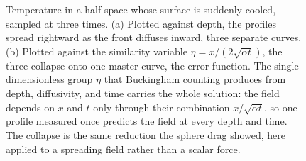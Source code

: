 \begin{figure}[htbp]
\caption[Similarity collapse of a transient-diffusion profile]{Temperature
in a half-space whose surface is suddenly cooled, sampled at three times.
(a) Plotted against depth, the profiles spread rightward as the front
diffuses inward, three separate curves. (b) Plotted against the similarity
variable $\eta = x/(2\sqrt{\alpha t})$, the three collapse onto one master
curve, the error function. The single dimensionless group $\eta$ that
Buckingham counting produces from depth, diffusivity, and time carries the
whole solution: the field depends on $x$ and $t$ only through their
combination $x/\sqrt{\alpha t}$, so one profile measured once predicts the
field at every depth and time. The collapse is the same reduction the sphere
drag showed, here applied to a spreading field rather than a scalar force.}
\label{fig:vol02ch18:similarity-collapse}
\end{figure}
